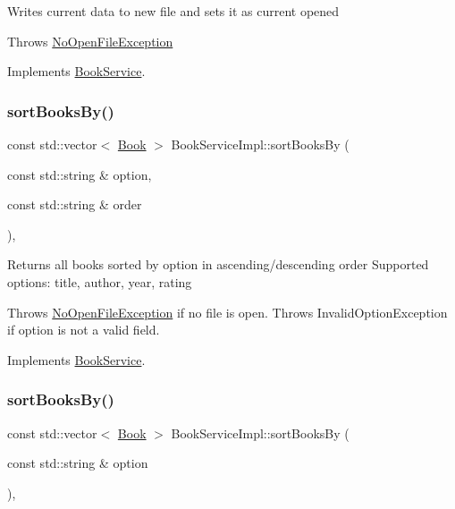 Writes current data to new file and sets it as current opened

Throws \hyperlink{structNoOpenFileException}{No\+Open\+File\+Exception} 

Implements \hyperlink{classBookService_aa98047f82d65f0514b1e7add838ecbe7}{Book\+Service}.

\mbox{\label{classBookServiceImpl_a597b769829c06f73168e08b900571cc5}} 
\subsubsection{\texorpdfstring{sort\+Books\+By()}{sortBooksBy()}\hspace{0.1cm}{\footnotesize\ttfamily [1/2]}}
{\footnotesize\ttfamily const std\+::vector$<$ \hyperlink{classBook}{Book} $>$ Book\+Service\+Impl\+::sort\+Books\+By (\begin{DoxyParamCaption}\item[{const std\+::string \&}]{option,  }\item[{const std\+::string \&}]{order }\end{DoxyParamCaption})\hspace{0.3cm}{\ttfamily [override]}, {\ttfamily [virtual]}}

Returns all books sorted by option in ascending/descending order Supported options\+: title, author, year, rating

Throws \hyperlink{structNoOpenFileException}{No\+Open\+File\+Exception} if no file is open. Throws Invalid\+Option\+Exception if option is not a valid field. 

Implements \hyperlink{classBookService_a6336a7b95ae7a0d0e77782607d2a0dc3}{Book\+Service}.

\mbox{\label{classBookServiceImpl_a95290c709cbb9fa56e3e2ca2753096d8}} 
\subsubsection{\texorpdfstring{sort\+Books\+By()}{sortBooksBy()}\hspace{0.1cm}{\footnotesize\ttfamily [2/2]}}
{\footnotesize\ttfamily const std\+::vector$<$ \hyperlink{classBook}{Book} $>$ Book\+Service\+Impl\+::sort\+Books\+By (\begin{DoxyParamCaption}\item[{const std\+::string \&}]{option }\end{DoxyParamCaption})\hspace{0.3cm}{\ttfamily [override]}, {\ttfamily [virtual]}}

